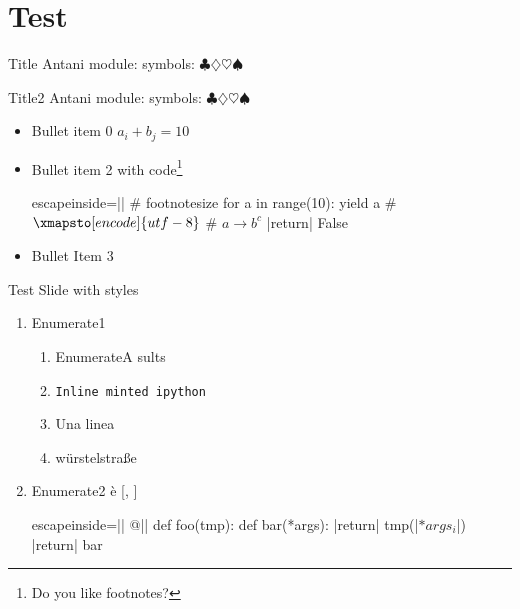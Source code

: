 \section{Test}

\begin{pyframe}{Title}{}
Antani
module: 
symbols: $\clubsuit \diamondsuit \heartsuit \spadesuit$
\end{pyframe}

\begin{pyframe}{Title2}
Antani
module: 
symbols: $\clubsuit \diamondsuit \heartsuit \spadesuit$
\end{pyframe}

\begin{pyframe}{}
\begin{itemize}
\item Bullet  item 0 $a_i + b_j = 10 $
\item Bullet  item 2 with code\footnote{Do you like footnotes?}
\begin{pycode*}{escapeinside=||}
    # footnotesize
    for  a in range(10):
        yield a
    # $\xmapsto[encode]{utf-8}$
    # $a \rightarrow b^{c}$
    |return| False
\end{pycode*}
\item Bullet Item 3
\end{itemize}
\end{pyframe}

\begin{pyframe}{Test Slide with styles}
\begin{enumerate}
\item Enumerate1  
    \begin{enumerate}
    \item EnumerateA  sults
    \item \texttt{Inline minted ipython}
    \item Una linea
    \item w\"urstelstra\ss e
    \end{enumerate}

\item Enumerate2 \`{e}
 [, ]
\begin{pycode*}{escapeinside=||}
@||
def foo(tmp):
    def bar(*args):
        |return| tmp(|$*args_{i}$|)
    |return| bar
\end{pycode*}

\end{enumerate}

\end{pyframe}

